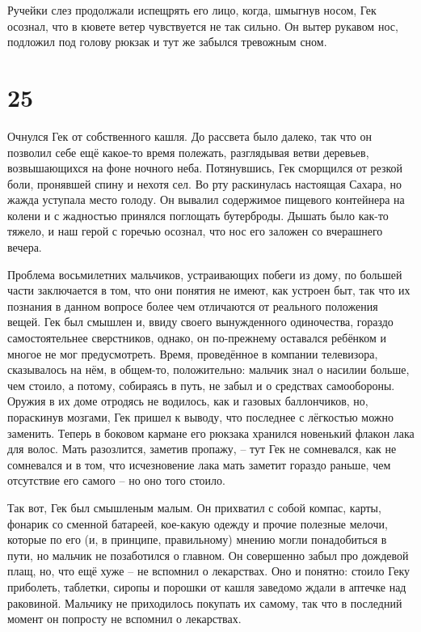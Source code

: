 \documentclass[
  a5paperpaper,
  DIV=11,
  numbers=noendperiod]{scrreprt}
\begin{document}
Ручейки слез продолжали испещрять его лицо, когда, шмыгнув носом, Гек
осознал, что в кювете ветер чувствуется не так сильно. Он вытер рукавом
нос, подложил под голову рюкзак и тут же забылся тревожным сном.

\section*{25}\label{25}


Очнулся Гек от собственного кашля. До рассвета было далеко, так что он
позволил себе ещё какое-то время полежать, разглядывая ветви деревьев,
возвышающихся на фоне ночного неба. Потянувшись, Гек сморщился от резкой
боли, пронявшей спину и нехотя сел. Во рту раскинулась настоящая Сахара,
но жажда уступала место голоду. Он вывалил содержимое пищевого
контейнера на колени и с жадностью принялся поглощать бутерброды. Дышать
было как-то тяжело, и наш герой с горечью осознал, что нос его заложен
со вчерашнего вечера.

Проблема восьмилетних мальчиков, устраивающих побеги из дому, по большей
части заключается в том, что они понятия не имеют, как устроен быт, так
что их познания в данном вопросе более чем отличаются от реального
положения вещей. Гек был смышлен и, ввиду своего вынужденного
одиночества, гораздо самостоятельнее сверстников, однако, он по-прежнему
оставался ребёнком и многое не мог предусмотреть. Время, проведённое в
компании телевизора, сказывалось на нём, в общем-то, положительно:
мальчик знал о насилии больше, чем стоило, а потому, собираясь в путь,
не забыл и о средствах самообороны. Оружия в их доме отродясь не
водилось, как и газовых баллончиков, но, пораскинув мозгами, Гек пришел
к выводу, что последнее с лёгкостью можно заменить. Теперь в боковом
кармане его рюкзака хранился новенький флакон лака для волос. Мать
разозлится, заметив пропажу, -- тут Гек не сомневался, как не сомневался
и в том, что исчезновение лака мать заметит гораздо раньше, чем
отсутствие его самого -- но оно того стоило.

Так вот, Гек был смышленым малым. Он прихватил с собой компас, карты,
фонарик со сменной батареей, кое-какую одежду и прочие полезные мелочи,
которые по его (и, в принципе, правильному) мнению могли понадобиться в
пути, но мальчик не позаботился о главном. Он совершенно забыл про
дождевой плащ, но, что ещё хуже -- не вспомнил о лекарствах. Оно и
понятно: стоило Геку приболеть, таблетки, сиропы и порошки от кашля
заведомо ждали в аптечке над раковиной. Мальчику не приходилось покупать
их самому, так что в последний момент он попросту не вспомнил о
лекарствах.
\end{document}
